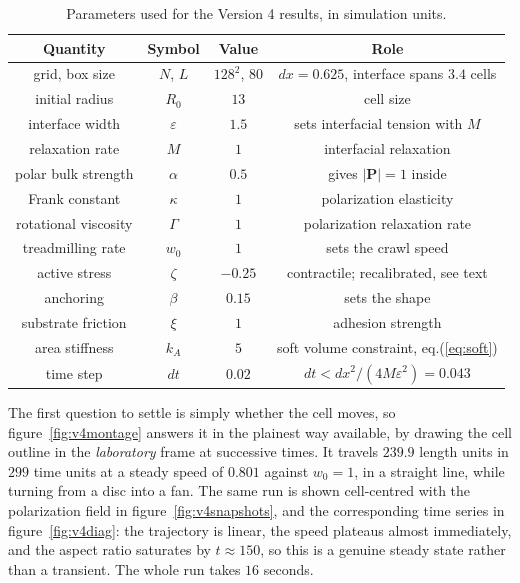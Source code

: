 \documentclass[11pt]{article}
\begin{document}
\begin{table} [ht!]
\begin{center}
\begin{tabular}{ |c|c|c|c| }
 \hline
 Quantity & Symbol & Value & Role \\
 \hline
 grid, box size & $N$, $L$ & $128^{2}$, $80$ & $dx=0.625$, interface spans $3.4$ cells\\
 \hline
 initial radius & $R_{0}$ & $13$ & cell size \\
 \hline
 interface width & $\varepsilon$ & $1.5$ & sets interfacial tension with $M$ \\
 \hline
 relaxation rate & $M$ & $1$ & interfacial relaxation \\
 \hline
 polar bulk strength & $\alpha$ & $0.5$ & gives $|\mathbf{P}|=1$ inside \\
 \hline
 Frank constant & $\kappa$ & $1$ & polarization elasticity \\
 \hline
 rotational viscosity & $\Gamma$ & $1$ & polarization relaxation rate \\
 \hline
 treadmilling rate & $w_{0}$ & $1$ & sets the crawl speed \\
 \hline
 active stress & $\zeta$ & $-0.25$ & contractile; recalibrated, see text \\
 \hline
 anchoring & $\beta$ & $0.15$ & sets the shape \\
 \hline
 substrate friction & $\xi$ & $1$ & adhesion strength \\
 \hline
 area stiffness & $k_{A}$ & $5$ & soft volume constraint, eq.(\ref{eq:soft}) \\
 \hline
 time step & $dt$ & $0.02$ & $dt<dx^{2}/(4M\varepsilon^{2})=0.043$ \\
 \hline
\end{tabular}
\end{center}
\caption{Parameters used for the Version 4 results, in simulation units.}
\label{tab:v4param}
\end{table}

The first question to settle is simply whether the cell moves, so
figure~\ref{fig:v4montage} answers it in the plainest way available, by drawing
the cell outline in the \textit{laboratory} frame at successive times. It travels
$239.9$ length units in $299$ time units at a steady speed of $0.801$ against
$w_{0}=1$, in a straight line, while turning from a disc into a fan. The same run
is shown cell-centred with the polarization field in
figure~\ref{fig:v4snapshots}, and the corresponding time series in
figure~\ref{fig:v4diag}: the trajectory is linear, the speed plateaus almost
immediately, and the aspect ratio saturates by $t\approx150$, so this is a genuine
steady state rather than a transient. The whole run takes $16$ seconds.
\end{document}
